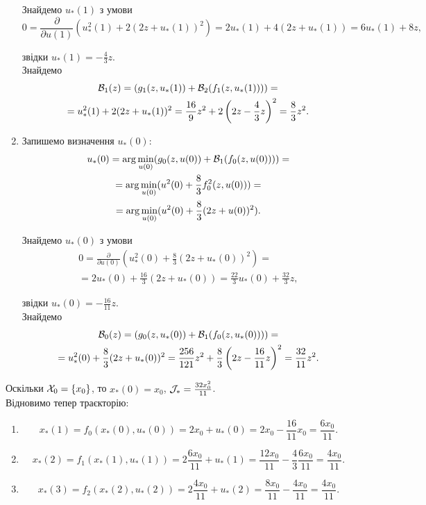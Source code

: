 \begin{solution}
\begin{enumerate}
	Знайдемо $u_*(1)$ з умови 
	\[ 0 = \frac{\partial}{\partial u(1)} \left(u_*^2(1) + 2 (2 z + u_*(1))^2 \right) = 2 u_*(1) + 4 (2 z + u_*(1)) = 6 u_*(1) + 8 z,\]

	звідки $u_*(1) = - \frac43 z$. \\

	Знайдемо
	\begin{multline*}
		\mathcal{B}_1 (z) = (g_1(z, u_*(1)) + \mathcal{B}_2(f_1(z,u_*(1)))) = \\
		= u_*^2(1) + 2 (2 z + u_*(1))^2 = \frac{16}{9} z^2 + 2 \left(2 z - \frac43z\right)^2 = \frac{8}{3} z^2.
	\end{multline*}


	\item Запишемо визначення $u_*(0)$:
	\begin{multline*} 
		u_*(0) = \arg\min_{u(0)} (g_0(z, u(0)) + \mathcal{B}_1(f_0(z,u(0)))) = \\
		= \arg\min_{u(0)} (u^2(0) + \frac{8}{3} f_0^2(z, u(0))) = \\
		= \arg\min_{u(0)} (u^2(0) + \frac{8}{3} (2 z + u(0))^2).
	\end{multline*}

	Знайдемо $u_*(0)$ з умови 
	\begin{multline*} 
		0 = \frac{\partial}{\partial u(0)} \left(u_*^2(0) + \frac{8}{3} (2 z + u_*(0))^2 \right) = \\
		= 2 u_*(0) + \frac{16}{3} (2 z + u_*(0)) = \frac{22}{3} u_*(0) + \frac{32}{3} z,
	\end{multline*}	

	звідки $u_*(0) = - \frac{16}{11} z$. \\

	Знайдемо
	\begin{multline*}
		\mathcal{B}_0 (z) = (g_0(z, u_*(0)) + \mathcal{B}_1(f_0(z,u_*(0)))) = \\
		= u_*^2(0) + \frac{8}{3} (2 z + u_*(0))^2 = \frac{256}{121} z^2 + \frac{8}{3} \left(2 z - \frac{16}{11} z\right)^2 = \frac{32}{11} z^2.
	\end{multline*}
	\end{enumerate}

	Оскільки $\mathcal{X}_0 = \{ x_0 \}$, то $x_*(0) = x_0$, $\mathcal{J}_* = \frac{32 x_0^2}{11}$. \\

	Відновимо тепер траєкторію: 
	\begin{enumerate}
		\item \[x_*(1) = f_0(x_*(0), u_*(0)) = 2 x_0 + u_*(0) = 2 x_0 - \frac{16}{11} x_0 = \frac{6 x_0}{11}.\]
		\item \[x_*(2) = f_1(x_*(1), u_*(1)) = 2 \frac{6 x_0}{11} + u_*(1) = \frac{12 x_0}{11} - \frac{4}{3} \frac{6 x_0}{11} = \frac{4 x_0}{11}.\]
		\item \[x_*(3) = f_2(x_*(2), u_*(2)) = 2 \frac{4 x_0}{11} + u_*(2) = \frac{8 x_0}{11} -  \frac{4 x_0}{11} = \frac{4 x_0}{11}.\]
	\end{enumerate}
\end{solution}

